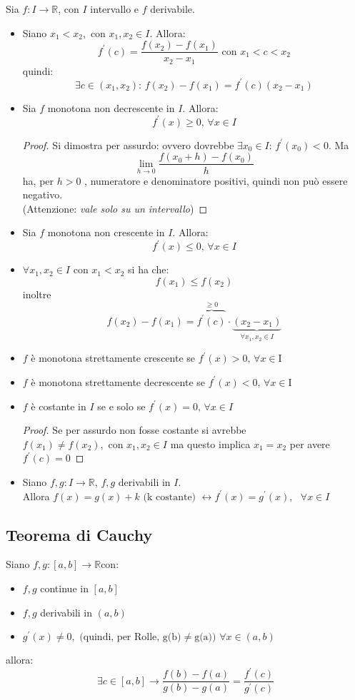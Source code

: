 \documentclass[a4paper,12pt, oneside]{book}
\begin{document}
\begin{corollario}
Sia $f:I\rightarrow \mathbb{R}$, con $I$ intervallo e $f$ derivabile.
\begin{itemize}
\item Siano $x_1<x_2, \mbox{ con } x_1,x_2\in I$. Allora:
$$f^{'}(c)=\frac{f(x_2)-f(x_1)}{x_2-x_1}\mbox{ con } x_1<c<x_2$$
quindi:
$$\exists c\in(x_1,x_2)\mbox{: } f(x_2)-f(x_1)=f^{'}(c)(x_2-x_1)$$
\item Sia $f$ monotona non decrescente in $I$. Allora: $$f^{'}(x)\geq 0\mbox{, }\forall x\in I$$
\begin{proof}
Si dimostra per assurdo: ovvero dovrebbe $\exists x_0\in I\mbox{: } f^{'}(x_0)<0$. Ma $$\lim_{h\rightarrow 0} \frac{f(x_0+h)-f(x_0)}{h}$$ ha, per $h>0$ , numeratore e denominatore positivi, quindi non può essere negativo.\\
(Attenzione: \textit{vale solo su un intervallo})
\end{proof}
\item Sia $f$ monotona non crescente in $I$. Allora: $$f^{'}(x)\leq 0\mbox{, }\forall x\in I$$
\item $\forall x_1, x_2 \in I\mbox{ con } x_1<x_2$ si ha che:
$$f(x_1)\leq f(x_2)$$
inoltre $$f(x_2)-f(x_1)=\overbrace{f^{'}(c)}^{\geq 0}\cdot\underbrace{(x_2-x_1)}_{\forall x_1, x_2 \in I}$$
\item $f$ è monotona strettamente crescente se $f^{'}(x)>0 \mbox{, }\forall x\in $I
\item $f$ è monotona strettamente decrescente se $f^{'}(x)<0 \mbox{, }\forall x\in $I
\item $f$ è costante in $I$ se e solo se $f^{'}(x)=0\mbox{, }\forall x\in I$
\begin{proof}
Se per assurdo non fosse costante si avrebbe $f(x_1)\neq f(x_2), \mbox{ con } x_1,x_2\in I$ ma questo implica $x_1=x_2$ per avere $f^{'}(c)=0$
\end{proof}
\item Siano $f,g:I\rightarrow \mathbb{R}$, $f,g$ derivabili in $I$. \\Allora $f(x)=g(x)+k\mbox { (k costante) }\longleftrightarrow f^{'}(x)=g^{'}(x),\mbox{ }\forall x\in I$
\end{itemize}
\end{corollario}
\subsection{Teorema di Cauchy}
\begin{teorema}[di Cauchy]
Siano $f,g:[a,b]\rightarrow \mathbb{R}$con:
\begin{itemize}
\item $f,g$ continue in $[a,b]$
\item $f,g$ derivabili in $(a,b)$
\item $g^{'}(x)\neq 0,\mbox{ (quindi, per Rolle, g(b)}\neq\mbox{g(a)) } \forall x\in (a,b)$
\end{itemize}
allora: $$\exists c\in [a,b]\rightarrow\frac{f(b)-f(a)}{g(b)-g(a)}=\frac{f^{'}(c)}{g^{'}(c)}$$
\end{teorema}
\end{document}
